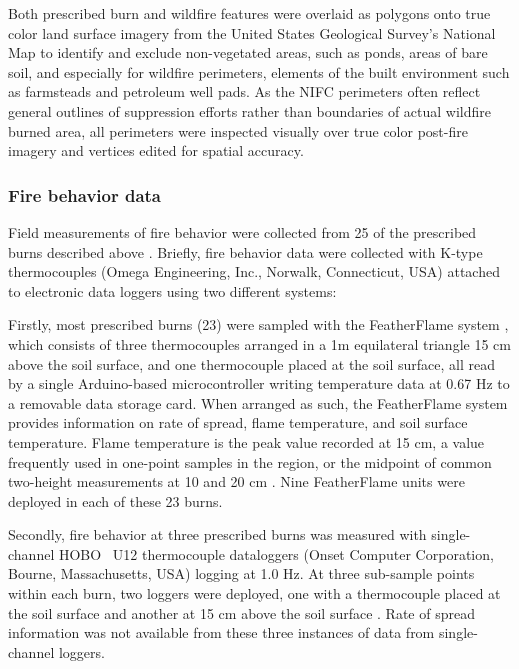 \documentclass[fire,article,submit,oneauthor,pdftex]{Definitions/mdpi}
\begin{document}
Both prescribed burn and wildfire features were overlaid as polygons onto true color land surface imagery from the United States Geological Survey's National Map \cite{usgs_nm} to identify and exclude non-vegetated areas, such as ponds, areas of bare soil, and especially for wildfire perimeters, elements of the built environment such as farmsteads and petroleum well pads. 
As the NIFC perimeters often reflect general outlines of suppression efforts rather than boundaries of actual wildfire burned area, all perimeters were inspected visually over true color post-fire imagery and vertices edited for spatial accuracy.  

\subsubsection{Fire behavior data}

Field measurements of fire behavior were collected from 25 of the prescribed burns described above \cite{mcgranahan2022,mcgranahan2023}.
Briefly, fire behavior data were collected with K-type thermocouples (Omega Engineering, Inc., Norwalk, Connecticut, USA) attached to electronic data loggers using two different systems: 

Firstly, most prescribed burns (23) were sampled with the FeatherFlame system \cite{mcgranahan2021}, which consists of three thermocouples arranged in a 1m equilateral triangle 15 cm above the soil surface, and one thermocouple placed at the soil surface, all read by a single Arduino-based microcontroller writing temperature data at 0.67 Hz to a removable data storage card.
When arranged as such, the FeatherFlame system provides information on rate of spread, flame temperature, and soil surface temperature. 
Flame temperature is the peak value recorded at 15 cm, a value frequently used in one-point samples in the region, or the midpoint of common two-height measurements at 10 and 20 cm \cite{mcgranahan2023}. 
Nine FeatherFlame units were deployed in each of these 23 burns.

Secondly, fire behavior at three prescribed burns was measured with single-channel HOBO\textregistered~ U12 thermocouple dataloggers (Onset Computer Corporation, Bourne, Massachusetts, USA) logging at 1.0 Hz. 
At three sub-sample points within each burn, two loggers were deployed, one with a thermocouple placed at the soil surface and another at 15 cm above the soil surface \cite{mcgranahan2022}. 
Rate of spread information was not available from these three instances of data from single-channel loggers. 
\end{document}

